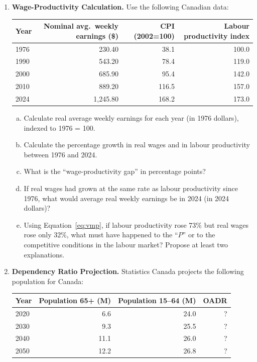 \begin{enumerate}
\item \textbf{Wage-Productivity Calculation.}
Use the following Canadian data:

\begin{center}
\begin{tabular}{lrrr}
\toprule
Year & Nominal avg.\ weekly earnings (\$) & CPI (2002=100) & Labour productivity index \\
\midrule
1976 & 230.40 & 38.1 & 100.0 \\
1990 & 543.20 & 78.4 & 119.0 \\
2000 & 685.90 & 95.4 & 142.0 \\
2010 & 889.20 & 116.5 & 157.0 \\
2024 & 1{,}245.80 & 168.2 & 173.0 \\
\bottomrule
\end{tabular}
\end{center}

\begin{enumerate}[(a)]
  \item Calculate real average weekly earnings for each year
        (in 1976 dollars), indexed to 1976 = 100.
  \item Calculate the percentage growth in real wages and in labour
        productivity between 1976 and 2024.
  \item What is the ``wage-productivity gap'' in percentage points?
  \item If real wages had grown at the same rate as labour productivity
        since 1976, what would average real weekly earnings be in 2024
        (in 2024 dollars)?
  \item Using Equation~\ref{eq:vmp}, if labour productivity rose 73\%
        but real wages rose only 32\%, what must have happened to the
        ``$P$'' or to the competitive conditions in the labour market?
        Propose at least two explanations.
\end{enumerate}

\item \textbf{Dependency Ratio Projection.}
Statistics Canada projects the following population for Canada:

\begin{center}
\begin{tabular}{lrrr}
\toprule
Year & Population 65+ (M) & Population 15--64 (M) & OADR \\
\midrule
2020 &  6.6 & 24.0 & ? \\
2030 &  9.3 & 25.5 & ? \\
2040 & 11.1 & 26.0 & ? \\
2050 & 12.2 & 26.8 & ? \\
\bottomrule
\end{tabular}
\end{center}


\end{enumerate}
